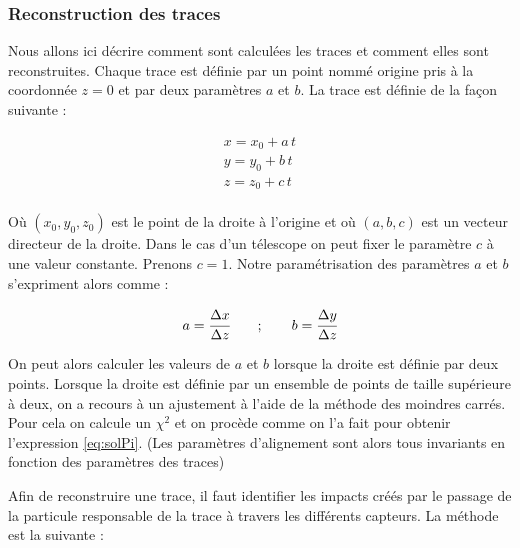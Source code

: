    \subsubsection{Reconstruction des traces}
   \label{sect:tracks_reconstr}
   
   Nous allons ici d\'ecrire comment sont calcul\'ees les traces et comment elles sont reconstruites. Chaque trace est d\'efinie par un point nomm\'e origine pris \`a la coordonn\'ee $z=0$ et par deux param\`etres $a$ et $b$. La trace est d\'efinie de la fa\c{c}on suivante : 
   
  \begin{eqnarray}
   x = x_0 + a \, t \\ \nonumber
   y = y_0 + b \, t \\ \nonumber
   z = z_0 + c \, t \\ \nonumber
  \end{eqnarray}
  
  O\`u $(x_0, y_0, z_0)$ est le point de la droite \`a l'origine et o\`u $(a, b, c)$ est un vecteur directeur de la droite. Dans le cas d'un t\'elescope on peut fixer le param\`etre $c$ \`a une valeur constante. Prenons $c=1$. Notre param\'etrisation des param\`etres $a$ et $b$ s'expriment alors comme :
   
  \begin{equation}
     a = \cfrac{\Delta x}{\Delta z} \qquad ; \qquad b = \cfrac{\Delta y}{\Delta z}
  \end{equation}
   
   On peut alors calculer les valeurs de $a$ et $b$ lorsque la droite est d\'efinie par deux points. Lorsque la droite est d\'efinie par un ensemble de points de taille sup\'erieure \`a deux, on a recours \`a un ajustement \`a l'aide de la m\'ethode des moindres carr\'es. Pour cela on calcule un $\chi^2$ et on proc\`ede comme on l'a fait pour obtenir l'expression \ref{eq:solPi}. (Les param\`etres d'alignement sont alors tous invariants en fonction des param\`etres des traces)
   
   \medskip
   
   Afin de reconstruire une trace, il faut identifier les impacts cr\'e\'es par le passage de la particule responsable de la trace \`a travers les diff\'erents capteurs. La m\'ethode est la suivante : 
   
   \medskip
   
